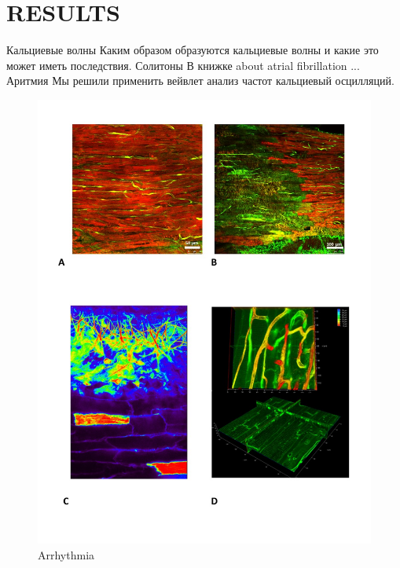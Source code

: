 \documentclass[a4paper,12pt]{article}
\begin{document}
\section{RESULTS}
Кальциевые волны
Каким образом образуются кальциевые волны и какие это может иметь последствия.
Солитоны
В книжке \cite{kockskamper2002subcellular} about atrial fibrillation ...
Аритмия
Мы решили применить вейвлет анализ частот кальциевый осцилляций.

\begin{figure}
    \includegraphics[width=\linewidth]{fig1.jpg}
    \caption{Arrhythmia}
    \label{fig:fig1}
\end{figure}
\end{document}
